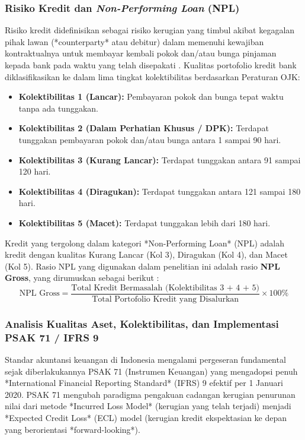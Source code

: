 \documentclass[12pt,a4paper]{article}
\numberwithin{equation}{section}
\begin{document}
\subsubsection{Risiko Kredit dan \emph{Non-Performing Loan} (NPL)}
\noindent
Risiko kredit didefinisikan sebagai risiko kerugian yang timbul akibat kegagalan pihak lawan (*counterparty* atau debitur) dalam memenuhi kewajiban kontraktualnya untuk membayar kembali pokok dan/atau bunga pinjaman kepada bank pada waktu yang telah disepakati \citep{KuncoroSuhardjono2018}. Kualitas portofolio kredit bank diklasifikasikan ke dalam lima tingkat kolektibilitas berdasarkan Peraturan OJK:
\begin{itemize}
  \item \textbf{Kolektibilitas 1 (Lancar):} Pembayaran pokok dan bunga tepat waktu tanpa ada tunggakan.
  \item \textbf{Kolektibilitas 2 (Dalam Perhatian Khusus / DPK):} Terdapat tunggakan pembayaran pokok dan/atau bunga antara 1 sampai 90 hari.
  \item \textbf{Kolektibilitas 3 (Kurang Lancar):} Terdapat tunggakan antara 91 sampai 120 hari.
  \item \textbf{Kolektibilitas 4 (Diragukan):} Terdapat tunggakan antara 121 sampai 180 hari.
  \item \textbf{Kolektibilitas 5 (Macet):} Terdapat tunggakan lebih dari 180 hari.
\end{itemize}

\noindent
Kredit yang tergolong dalam kategori *Non-Performing Loan* (NPL) adalah kredit dengan kualitas Kurang Lancar (Kol 3), Diragukan (Kol 4), dan Macet (Kol 5). Rasio NPL yang digunakan dalam penelitian ini adalah rasio \textbf{NPL Gross}, yang dirumuskan sebagai berikut \citep{Dendawijaya2015, OJK2021}:
\begin{equation}
  \text{NPL Gross} = \frac{\text{Total Kredit Bermasalah (Kolektibilitas 3 + 4 + 5)}}{\text{Total Portofolio Kredit yang Disalurkan}} \times 100\%
\end{equation}

\subsubsection{Analisis Kualitas Aset, Kolektibilitas, dan Implementasi PSAK 71 / IFRS 9}
\noindent
Standar akuntansi keuangan di Indonesia mengalami pergeseran fundamental sejak diberlakukannya PSAK 71 (Instrumen Keuangan) yang mengadopsi penuh *International Financial Reporting Standard* (IFRS) 9 efektif per 1 Januari 2020. PSAK 71 mengubah paradigma pengakuan cadangan kerugian penurunan nilai dari metode *Incurred Loss Model* (kerugian yang telah terjadi) menjadi *Expected Credit Loss* (ECL) model (kerugian kredit ekspektasian ke depan yang berorientasi *forward-looking*).
\end{document}
